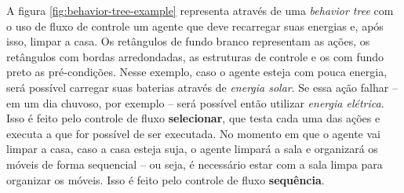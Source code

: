 A figura \ref{fig:behavior-tree-example} representa através de uma
\textit{behavior tree} com o uso de fluxo de controle um agente que deve
recarregar suas energias e, após isso, limpar a casa. Os retângulos de
fundo branco representam as ações, os retângulos com bordas arredondadas,
as estruturas de controle e os com fundo preto as pré-condições. Nesse
exemplo, caso o agente esteja com pouca energia, será possível carregar
suas baterias através de \textit{energia solar}. Se essa ação falhar -- em
um dia chuvoso, por exemplo -- será possível então utilizar
\textit{energia elétrica}. Isso é feito pelo controle de fluxo
\textbf{selecionar}, que testa cada uma das ações e executa a que for
possível de ser executada.  No momento em que o agente vai limpar a casa,
caso a casa esteja suja, o agente limpará a sala e organizará os móveis de
forma sequencial -- ou seja, é necessário estar com a sala limpa para
organizar os móveis. Isso é feito pelo controle de fluxo
\textbf{sequência}.

